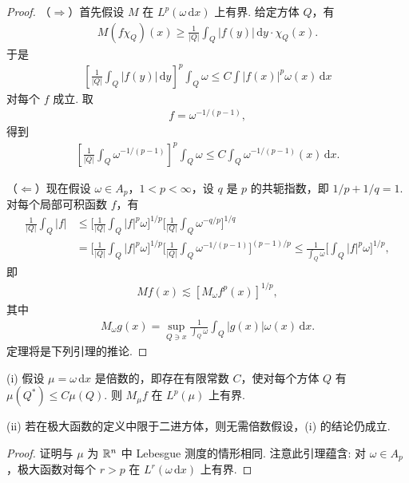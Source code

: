 \begin{proof}
（$\Rightarrow$）首先假设 $M$ 在 $L^p(\omega\,\mathrm{d}x)$ 上有界. 给定方体 $Q$，有
\begin{align*}
  M(f\chi_{Q})(x)\geq\frac{1}{|Q|}\int_{Q}\left|f(y)\right|\,\mathrm{d}y\cdot\chi_{Q}(x).
\end{align*}
于是
\begin{align*}
  \left[\frac{1}{\left|Q\right|}\int_{Q}\left|f(y)\right|\,\mathrm{d}y\right]^{p}\int_{Q}\omega
  \leq C\int\left|f(x)\right|^{p}\omega(x)\,\mathrm{d}x
\end{align*}
对每个 $f$ 成立. 取
\begin{align*}
  f=\omega^{-1/(p-1)},
\end{align*}
得到
\begin{align*}
  \left[\frac{1}{\left|Q\right|}\int_{Q}\omega^{-1/(p-1)}\right]^{p}\int_{Q}\omega
  \leq C\int_{Q}\omega^{-1/(p-1)}(x)\,\mathrm{d}x.
\end{align*}

（$\Leftarrow$）现在假设 $\omega \in A_p$，$1 < p < \infty$，设 $q$ 是 $p$ 的共轭指数，即 $1/p + 1/q = 1$. 对每个局部可积函数 $f$，有
\begin{align*}
  \frac{1}{|Q|}\int_{Q}|f|
  &\leq\Big[\frac{1}{|Q|}\int_{Q}|f|^{p}\omega\Big]^{1/p}
   \Big[\frac{1}{|Q|}\int_{Q}\omega^{-q/p}\Big]^{1/q}\\
  &=\Big[\frac{1}{|Q|}\int_{Q}|f|^{p}\omega\Big]^{1/p}
   \Big[\frac{1}{|Q|}\int_{Q}\omega^{-1/(p-1)}\Big]^{(p-1)/p}
  \leq\frac{1}{\int_{Q}\omega}\Big[\int_{Q}|f|^{p}\omega\Big]^{1/p},
\end{align*}
即
\begin{align*}
  M f(x)\lesssim[M_{\omega}f^{p}(x)]^{1/p},
\end{align*}
其中
\begin{align*}
  M_{\omega}g(x)=\sup_{Q\ni x}\frac{1}{\int_{Q}\omega}\int_{Q}|g(x)|\omega(x)\,\mathrm{d}x.
\end{align*}
定理将是下列引理的推论.
\end{proof}

\begin{lemma}\label{lem:4.16}
(i) 假设 $\mu = \omega\,\mathrm{d}x$ 是倍数的，即存在有限常数 $C$，使对每个方体 $Q$ 有 $\mu(Q^*) \leq C\mu(Q)$. 则 $M_\mu f$ 在 $L^p(\mu)$ 上有界.

(ii) 若在极大函数的定义中限于二进方体，则无需倍数假设，(i) 的结论仍成立.
\end{lemma}

\begin{proof}
证明与 $\mu$ 为 $\mathbb{R}^n$ 中 Lebesgue 测度的情形相同. 注意此引理蕴含: 对 $\omega \in A_p$，极大函数对每个 $r > p$ 在 $L^r(\omega\,\mathrm{d}x)$ 上有界.
\end{proof}

